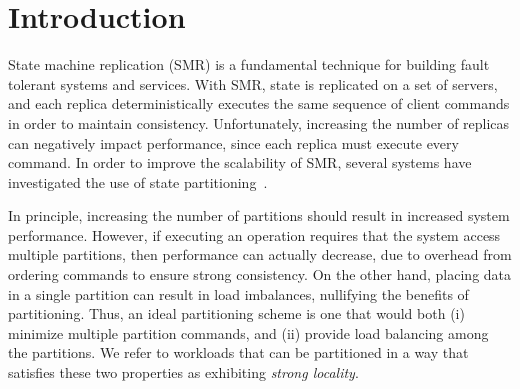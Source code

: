 \section{Introduction}

State machine replication (SMR) is a fundamental technique for
building fault tolerant systems and services. With SMR, state is
replicated on a set of servers, and each replica deterministically
executes the same sequence of client commands in order to maintain
consistency. Unfortunately, increasing the number of replicas can
negatively impact performance, since each replica must execute every
command.  In order to improve the scalability of SMR, several systems
have investigated the use of state partitioning~\cite{facebookTAO,
  sciascia2012sdur, Aguilera:2007}.


In principle, increasing the number of partitions should result in
increased system performance. However, if executing an operation
requires that the system access multiple partitions, then performance
can actually decrease, due to overhead from ordering commands to
ensure strong consistency. On the other hand, placing data in a single
partition can result in load imbalances, nullifying the benefits of
partitioning.  Thus, an ideal partitioning scheme is one that would
both (i) minimize multiple partition commands, and (ii) provide load
balancing among the partitions. We refer to workloads that can be
partitioned in a way that satisfies these two properties as exhibiting
\emph{strong locality}.



